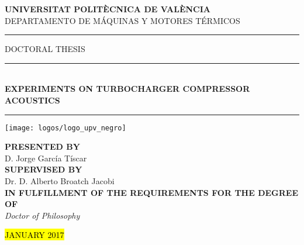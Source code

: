 \documentclass[final,twoside,11pt]{book}
\makeatletter
\numberwithin{equation}{section}
\numberwithin{figure}{chapter}
\numberwithin{table}{chapter}
\def\cleardoublepage{\clearpage\if@twoside \ifodd\c@page\else
  \hbox{}
  \thispagestyle{empty}
  \newpage
  \if@twocolumn\hbox{}\newpage\fi\fi\fi}
\makeatother
\begin{document}
\frontmatter

%

\enlargethispage{5cm}
\thispagestyle{empty}
\begin{center}
\Large\cabin\textbf{UNIVERSITAT POLITÈCNICA DE VALÈNCIA}\\[1mm]
\large DEPARTAMENTO DE MÁQUINAS Y MOTORES TÉRMICOS\\
\vspace{1cm}

\rule[0.3\baselineskip]{3.8cm}{0.4pt}
\noindent\cabin\large{\hspace{2mm}DOCTORAL THESIS\hspace{2mm}}
\rule[0.3\baselineskip]{3.8cm}{0.4pt}
\vspace{2mm}\\
\huge\textbf{EXPERIMENTS ON TURBOCHARGER COMPRESSOR ACOUSTICS}\\
\vspace{-2.5mm}
\rule{\textwidth}{0.4pt}
\vspace{1cm}

\texttt{[image: logos/logo\_upv\_negro]}

\vspace{1.3cm}

{\normalsize\bfseries\cabincondensed PRESENTED BY}\\
\rm\Large D. Jorge García Tíscar\\[4mm]
{\normalsize\bfseries\cabincondensed SUPERVISED BY}\\
\rm\Large Dr. D. Alberto Broatch Jacobi\\[8mm]

{\normalsize\bfseries\cabincondensed IN FULFILLMENT OF THE REQUIREMENTS FOR THE DEGREE OF}\\[2mm]
\it\Large Doctor of Philosophy

\vspace{1.2cm}

\footnotesize\rm\cabin \hl{JANUARY 2017}
\end{center}
\cleardoublepage
\end{document}
